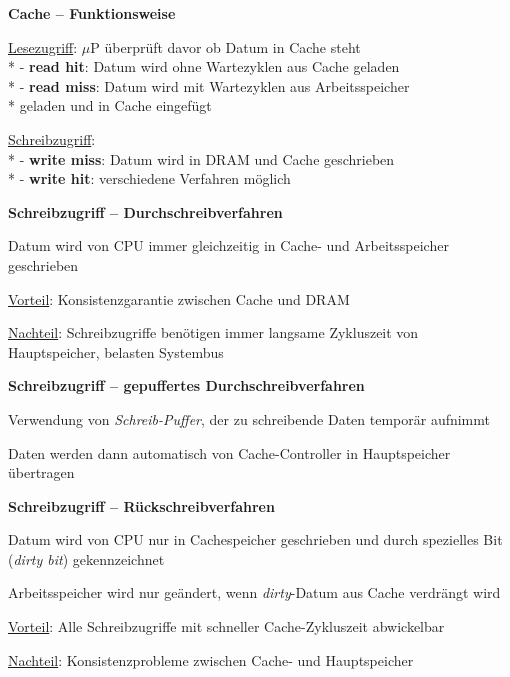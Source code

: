 \textbf{Cache -- Funktionsweise}
\begin{items}
	\item \underline{Lesezugriff}: \( \mu \)P überprüft davor ob Datum in Cache steht \\*
		- \textbf{read hit}: Datum wird ohne Wartezyklen aus Cache geladen \\*
		- \textbf{read miss}: Datum wird mit Wartezyklen aus Arbeitsspeicher \\* \phantom{-} geladen und in Cache eingefügt
	\item \underline{Schreibzugriff}: \\*
		- \textbf{write miss}: Datum wird in DRAM und Cache geschrieben \\*
		- \textbf{write hit}: verschiedene Verfahren möglich
\end{items}

\textbf{Schreibzugriff -- Durchschreibverfahren}
\begin{items}
	\item Datum wird von CPU immer gleichzeitig in Cache- und Arbeitsspeicher geschrieben
	\item \underline{Vorteil}: Konsistenzgarantie zwischen Cache und DRAM
	\item \underline{Nachteil}: Schreibzugriffe benötigen immer langsame Zykluszeit von Hauptspeicher, belasten Systembus
\end{items}

\textbf{Schreibzugriff -- gepuffertes Durchschreibverfahren}
\begin{items}
	\item Verwendung von \emph{Schreib-Puffer}, der zu schreibende Daten temporär aufnimmt
	\item Daten werden dann automatisch von Cache-Controller in Hauptspeicher übertragen
\end{items}

\textbf{Schreibzugriff -- Rückschreibverfahren}
\begin{items}
	\item Datum wird von CPU nur in Cachespeicher geschrieben und durch spezielles Bit (\emph{dirty bit}) gekennzeichnet
	\item Arbeitsspeicher wird nur geändert, wenn \emph{dirty}-Datum aus Cache verdrängt wird
	\item \underline{Vorteil}: Alle Schreibzugriffe mit schneller Cache-Zykluszeit abwickelbar
	\item \underline{Nachteil}: Konsistenzprobleme zwischen Cache- und Hauptspeicher
\end{items}

